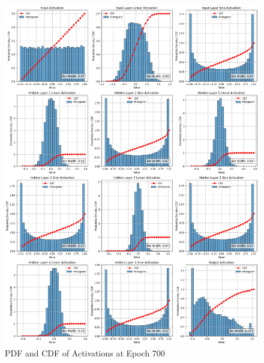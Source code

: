 \documentclass{ioereport}
\begin{document}
    \begin{figure}[H]
        \centering
        \includegraphics[width=\linewidth]{assets/video histogram/epoch700activations.png}
        \caption{PDF and CDF of Activations at Epoch 700}
        \label{fig:video-activation-700}
    \end{figure}
\end{document}
